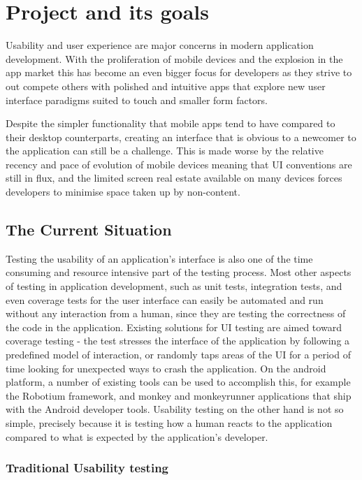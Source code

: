 \chapter{Project and its goals}

Usability and user experience are major concerns in modern application development. With the proliferation of mobile devices and the explosion in the app market this has become an even bigger focus for developers as they strive to out compete others with polished and intuitive apps that explore new user interface paradigms suited to touch and smaller form factors.

Despite the simpler functionality that mobile apps tend to have compared to their desktop counterparts, creating an interface that is obvious to a newcomer to the application can still be a challenge. This is made worse by the relative recency and pace of evolution of mobile devices meaning that UI conventions are still in flux, and the limited screen real estate available on many devices forces developers to minimise space taken up by non-content.

\section{The Current Situation}

Testing the usability of an application’s interface is also one of the time consuming and resource intensive part of the testing process. Most other aspects of testing in application development, such as unit tests, integration tests, and even coverage tests for the user interface can easily be automated and run without any interaction from a human, since they are testing the correctness of the code in the application. Existing solutions for UI testing are aimed toward coverage testing - the test stresses the interface of the application by following a predefined model of interaction, or randomly taps areas of the UI for a period of time looking for unexpected ways to crash the application. On the android platform, a number of existing tools can be used to accomplish this, for example the Robotium \cite{robotium} framework, and monkey and monkeyrunner \cite{monkeyrunner} applications that ship with the Android developer tools. Usability testing on the other hand is not so simple, precisely because it is testing how a human reacts to the application compared to what is expected by the application’s developer.

\subsection{Traditional Usability testing}

